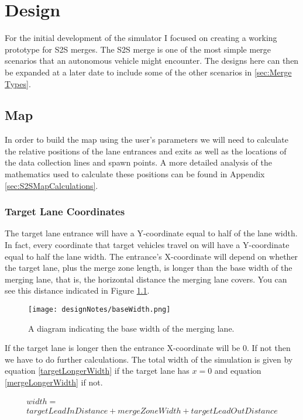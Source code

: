 \chapter{Design}
\label{cha:Design}
For the initial development of the simulator I focused on creating a working prototype for S2S merges. The S2S merge is one of the most simple merge scenarios that an autonomous vehicle might encounter. The designs here can then be expanded at a later date to include some of the other scenarios in \ref{sec:Merge Types}.

\section{Map}
\label{sec:Map}
In order to build the map using the user's parameters we will need to calculate the relative positions of the lane entrances and exits as well as the locations of the data collection lines and spawn points. A more detailed analysis of the mathematics used to calculate these positions can be found in Appendix \ref{sec:S2SMapCalculations}.

\subsection{Target Lane Coordinates}
\label{subsec:Target Lane Coordinates}
The target lane entrance will have a Y-coordinate equal to half of the lane width. In fact, every coordinate that target vehicles travel on will have a Y-coordinate equal to half the lane width. The entrance's X-coordinate will depend on whether the target lane, plus the merge zone length, is longer than the base width of the merging lane, that is, the horizontal distance the merging lane covers. You can see this distance indicated in Figure \ref{fig:baseWidth}.

\begin{figure}[htb]
\texttt{[image: designNotes/baseWidth.png]}
\caption{A diagram indicating the base width of the merging lane.}
\label{fig:baseWidth}
\end{figure}

If the target lane is longer then the entrance X-coordinate will be $0$. If not then we have to do further calculations. The total width of the simulation is given by equation \ref{targetLongerWidth} if the target lane has $x=0$ and equation \ref{mergeLongerWidth} if not.

\begin{multline}\label{targetLongerWidth}
width = \\
targetLeadInDistance + mergeZoneWidth + targetLeadOutDistance
\end{multline}

